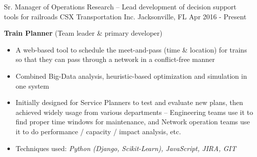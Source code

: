 

\begin{cventries}

\cventry
{Sr. Manager of Operations Research \tiny{-- Lead development of decision support tools for railroads}}     %
{CSX Transportation Inc.}                %
{Jacksonville, FL}                       %
{Apr 2016 - Present}                     %
{
    \begin{cvitems}
        \item {
\textbf{Train Planner} {(Team leader \& primary developer) }   
\begin{itemize}
    \item  A web-based tool to schedule the meet-and-pass (time \& location) for trains so that they can pass through a network in a conflict-free manner
    \item  Combined Big-Data analysis, heuristic-based optimization and simulation in one system
    \item  Initially designed for Service Planners to test and evaluate new plans, then achieved widely usage from various departments -- Engineering teams use it to find proper time windows for maintenance, and Network operation teams use it to do performance / capacity / impact analysis, etc.
    \item  Techniques used: \textit{Python (Django, Scikit-Learn), JavaScript, JIRA, GIT}
\end{itemize}           
        }
    \end{cvitems}%
}


\end{cventries}
